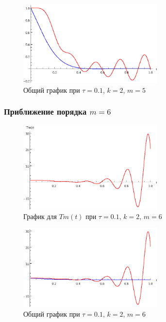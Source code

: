 \begin{figure}[h]
\begin{center}
\includegraphics[width=0.65\textwidth]{./3_results/2_11.eps}
\end{center}
\caption{Общий график при $\tau=0.1$, $k=2$, $m=5$}
\end{figure}

\newpage

\subsubsection{Приближение порядка $m=6$}

\begin{figure}[h]
\begin{center}
\includegraphics[width=0.65\textwidth]{./3_results/2_12.eps}
\end{center}
\caption{График для $Tm(t)$ при $\tau=0.1$, $k=2$, $m=6$}
\end{figure}

\begin{figure}[h]
\begin{center}
\includegraphics[width=0.65\textwidth]{./3_results/2_13.eps}
\end{center}
\caption{Общий график при $\tau=0.1$, $k=2$, $m=6$}
\end{figure}

